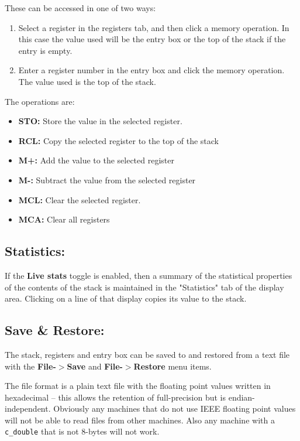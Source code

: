 \documentclass{article}
\begin{document}
  These can be accessed in one of two ways:
  \begin{enumerate}
  \item Select a register in the registers tab, and then click a memory
    operation. In this case the value used will be the entry box or the
    top of the stack if the entry is empty.
  \item Enter a register number in the entry box and click the memory
    operation. The value used is the top of the stack.
  \end{enumerate}

  The operations are:
  \begin{itemize}
  \item \textbf{STO:} Store the value in the selected register.
  \item \textbf{RCL:} Copy the selected register to the top of the
    stack
  \item \textbf{M+:} Add the value to the selected register
  \item \textbf{M-:} Subtract the value from the selected register
  \item \textbf{MCL:} Clear the selected register.
  \item \textbf{MCA:} Clear all registers

  \end{itemize}

  \subsection{Statistics:}

  If the \textbf{Live stats} toggle is enabled, then a summary of the
  statistical properties of the contents of the stack is maintained in
  the "Statistics" tab of the display area. Clicking on a line of that
  display copies its value to the stack.

  \subsection{Save \& Restore:}

  The stack, registers and entry box can be saved to and restored from
  a text file with the \textbf{File-$>$Save} and
  \textbf{File-$>$Restore} menu items.

  The file format is a plain text file with the floating point values
  written in hexadecimal -- this allows the retention of full-precision
  but is endian-independent. Obviously any machines that do not use
  IEEE floating point values will not be able to read files from other
  machines. Also any machine with a \texttt{c\_double} that is not
  8-bytes will not work.
\end{document}
